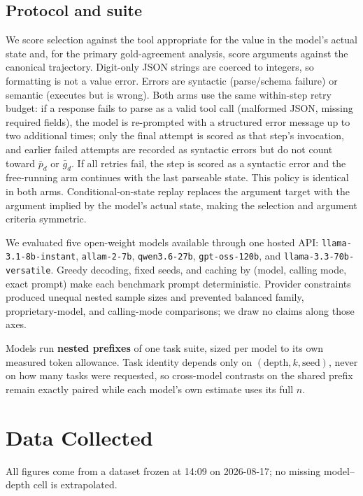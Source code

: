 \documentclass{article}
\begin{document}
\subsection{Protocol and suite}

We score selection against the tool appropriate for the value in the model's actual state and, for the primary gold-agreement analysis, score arguments against the canonical trajectory. Digit-only JSON strings are coerced to integers, so formatting is not a value error. Errors are syntactic (parse/schema failure) or semantic (executes but is wrong). Both arms use the same within-step retry budget: if a response fails to parse as a valid tool call (malformed JSON, missing required fields), the model is re-prompted with a structured error message up to two additional times; only the final attempt is scored as that step's invocation, and earlier failed attempts are recorded as syntactic errors but do not count toward $\bar p_d$ or $\bar g_d$. If all retries fail, the step is scored as a syntactic error and the free-running arm continues with the last parseable state. This policy is identical in both arms. Conditional-on-state replay replaces the argument target with the argument implied by the model's actual state, making the selection and argument criteria symmetric.

We evaluated five open-weight models available through one hosted API: \texttt{llama-3.1-8b-instant}, \texttt{allam-2-7b}, \texttt{qwen3.6-27b}, \texttt{gpt-oss-120b}, and \texttt{llama-3.3-70b-versatile}. Greedy decoding, fixed seeds, and caching by (model, calling mode, exact prompt) make each benchmark prompt deterministic. Provider constraints produced unequal nested sample sizes and prevented balanced family, proprietary-model, and calling-mode comparisons; we draw no claims along those axes.

Models run \textbf{nested prefixes} of one task suite, sized per model to its own measured token allowance. Task identity depends only on $(\mathrm{depth},k,\mathrm{seed})$, never on how many tasks were requested, so cross-model contrasts on the shared prefix remain exactly paired while each model's own estimate uses its full $n$.

\section{Data Collected}
\label{sec:data}

All figures come from a dataset frozen at 14:09 on 2026-08-17; no missing model--depth cell is extrapolated.
\end{document}
